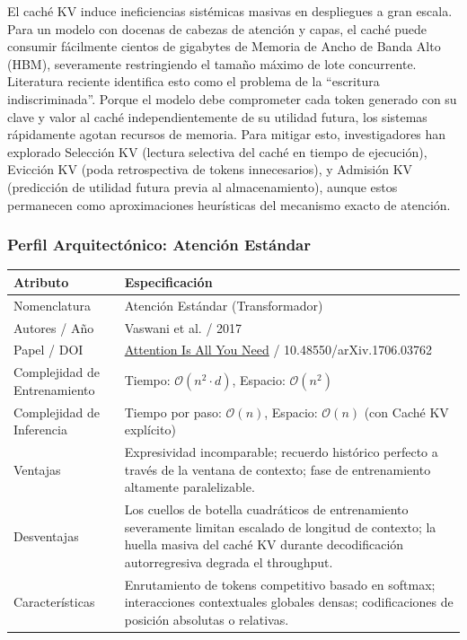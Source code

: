 \documentclass[11pt,a4paper]{article}
\begin{document}
El caché KV induce ineficiencias sistémicas masivas en despliegues a gran escala. Para un modelo con docenas de cabezas de atención y capas, el caché puede consumir fácilmente cientos de gigabytes de Memoria de Ancho de Banda Alto (HBM), severamente restringiendo el tamaño máximo de lote concurrente. Literatura reciente identifica esto como el problema de la ``escritura indiscriminada''. Porque el modelo debe comprometer cada token generado con su clave y valor al caché independientemente de su utilidad futura, los sistemas rápidamente agotan recursos de memoria. Para mitigar esto, investigadores han explorado Selección KV (lectura selectiva del caché en tiempo de ejecución), Evicción KV (poda retrospectiva de tokens innecesarios), y Admisión KV (predicción de utilidad futura previa al almacenamiento), aunque estos permanecen como aproximaciones heurísticas del mecanismo exacto de atención.

\subsubsection{Perfil Arquitectónico: Atención Estándar}

\begin{center}
\begin{tabular}{|l|p{11cm}|}
\hline
\textbf{Atributo} & \textbf{Especificación} \\
\hline
Nomenclatura & Atención Estándar (Transformador) \\
\hline
Autores / Año & Vaswani et al. / 2017 \\
\hline
Papel / DOI & \href{https://arxiv.org/abs/1706.03762}{Attention Is All You Need} / 10.48550/arXiv.1706.03762 \\
\hline
Complejidad de Entrenamiento & Tiempo: $\mathcal{O}(n^2 \cdot d)$, Espacio: $\mathcal{O}(n^2)$ \\
\hline
Complejidad de Inferencia & Tiempo por paso: $\mathcal{O}(n)$, Espacio: $\mathcal{O}(n)$ (con Caché KV explícito) \\
\hline
Ventajas & Expresividad incomparable; recuerdo histórico perfecto a través de la ventana de contexto; fase de entrenamiento altamente paralelizable. \\
\hline
Desventajas & Los cuellos de botella cuadráticos de entrenamiento severamente limitan escalado de longitud de contexto; la huella masiva del caché KV durante decodificación autorregresiva degrada el throughput. \\
\hline
Características & Enrutamiento de tokens competitivo basado en softmax; interacciones contextuales globales densas; codificaciones de posición absolutas o relativas. \\
\hline
\end{tabular}
\end{center}
\end{document}
